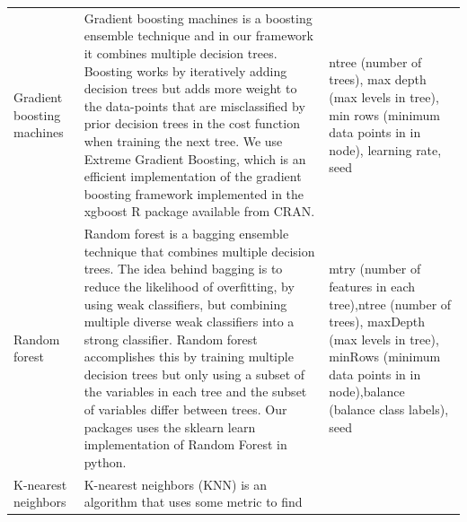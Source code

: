 \documentclass[]{article}
\begin{document}
\begin{longtable}[]{@{}lll@{}}
\begin{minipage}[t]{0.12\columnwidth}\raggedright\strut
Gradient boosting machines\strut
\end{minipage} & \begin{minipage}[t]{0.55\columnwidth}\raggedright\strut
Gradient boosting machines is a boosting ensemble technique and in our
framework it combines multiple decision trees. Boosting works by
iteratively adding decision trees but adds more weight to the
data-points that are misclassified by prior decision trees in the cost
function when training the next tree. We use Extreme Gradient Boosting,
which is an efficient implementation of the gradient boosting framework
implemented in the xgboost R package available from CRAN.\strut
\end{minipage} & \begin{minipage}[t]{0.25\columnwidth}\raggedright\strut
ntree (number of trees), max depth (max levels in tree), min rows
(minimum data points in in node), learning rate, seed\strut
\end{minipage}\tabularnewline
\begin{minipage}[t]{0.12\columnwidth}\raggedright\strut
Random forest\strut
\end{minipage} & \begin{minipage}[t]{0.55\columnwidth}\raggedright\strut
Random forest is a bagging ensemble technique that combines multiple
decision trees. The idea behind bagging is to reduce the likelihood of
overfitting, by using weak classifiers, but combining multiple diverse
weak classifiers into a strong classifier. Random forest accomplishes
this by training multiple decision trees but only using a subset of the
variables in each tree and the subset of variables differ between trees.
Our packages uses the sklearn learn implementation of Random Forest in
python.\strut
\end{minipage} & \begin{minipage}[t]{0.25\columnwidth}\raggedright\strut
mtry (number of features in each tree),ntree (number of trees), maxDepth
(max levels in tree), minRows (minimum data points in in node),balance
(balance class labels), seed\strut
\end{minipage}\tabularnewline
\begin{minipage}[t]{0.12\columnwidth}\raggedright\strut
K-nearest neighbors\strut
\end{minipage} & \begin{minipage}[t]{0.55\columnwidth}\raggedright\strut
K-nearest neighbors (KNN) is an algorithm that uses some metric to find

\end{minipage}
\end{longtable}
\end{document}
